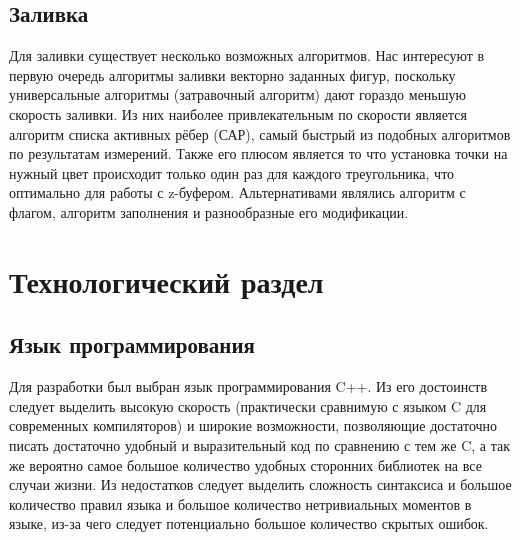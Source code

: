 \documentclass[a4paper,12pt]{report}
\begin{document}
\subsection{Заливка}
Для заливки существует несколько возможных алгоритмов. Нас интересуют в первую очередь алгоритмы заливки векторно заданных фигур, поскольку универсальные алгоритмы (затравочный алгоритм) дают гораздо меньшую скорость заливки. Из них наиболее привлекательным по скорости является алгоритм списка активных рёбер (САР), самый быстрый из подобных алгоритмов по результатам измерений. Также его плюсом является то что установка точки на нужный цвет происходит только один раз для каждого треугольника, что оптимально для работы с z-буфером. Альтернативами являлись алгоритм с флагом, алгоритм заполнения и разнообразные его модификации.

\section{Технологический раздел}

\subsection{Язык программирования}
Для разработки был выбран язык программирования C++. Из его достоинств следует выделить высокую скорость (практически сравнимую с языком C для современных компиляторов) и широкие возможности, позволяющие достаточно писать достаточно удобный и выразительный код по сравнению с тем же C, а так же вероятно самое большое количество удобных сторонних библиотек на все случаи жизни. Из недостатков следует выделить сложность синтаксиса и большое количество правил языка и большое количество нетривиальных моментов в языке, из-за чего следует потенциально большое количество скрытых ошибок.
\end{document}
